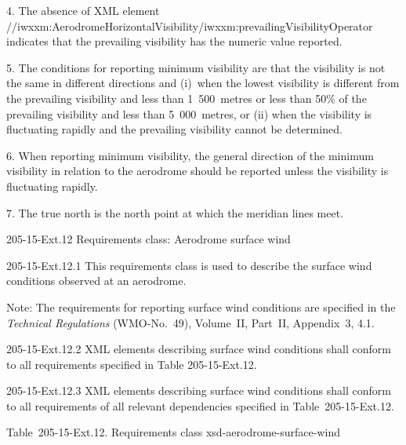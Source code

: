 4. The absence of XML element //iwxxm:AerodromeHorizontalVisibility/iwxxm:prevailingVisibilityOperator indicates that the prevailing visibility has the numeric value reported.

5. The conditions for reporting minimum visibility are that the visibility is not the same in different directions and (i)~when the lowest visibility is different from the prevailing visibility and less than 1~500~metres or less than 50\% of the prevailing visibility and less than 5~000~metres, or (ii) when the visibility is fluctuating rapidly and the prevailing visibility cannot be determined.

6. When reporting minimum visibility, the general direction of the minimum visibility in relation to the aerodrome should be reported unless the visibility is fluctuating rapidly.

7. The true north is the north point at which the meridian lines meet.

205-15-Ext.12 Requirements class: Aerodrome surface wind

205-15-Ext.12.1 This requirements class is used to describe the surface wind conditions observed at an aerodrome.

Note: The requirements for reporting surface wind conditions are specified in the \emph{Technical Regulations} (WMO-No.~49), Volume~II, Part~II, Appendix~3, 4.1.

205-15-Ext.12.2 XML elements describing surface wind conditions shall conform to all requirements specified in Table 205-15-Ext.12.

205-15-Ext.12.3 XML elements describing surface wind conditions shall conform to all requirements of all relevant dependencies specified in Table~205-15-Ext.12.

Table~205-15-Ext.12. Requirements class xsd-aerodrome-surface-wind


